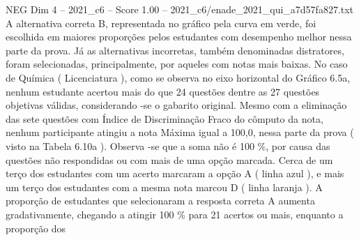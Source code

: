 \begin{textsample}{NEG Dim 4 – 2021\_c6 – Score 1.00 – 2021\_c6/enade\_2021\_qui\_a7d57fa827.txt}
A alternativa correta B, representada no gráfico pela curva em verde, foi escolhida em maiores proporções pelos estudantes com desempenho melhor nessa parte da prova.
Já as alternativas incorretas, também denominadas distratores, foram selecionadas, principalmente, por aqueles com notas mais baixas.
No caso de Química ( Licenciatura ), como se observa no eixo horizontal do Gráfico 6.5a, nenhum estudante acertou mais do que 24 questões dentre as 27 questões objetivas válidas, considerando -se o gabarito original.
Mesmo com a eliminação das sete questões com Índice de Discriminação Fraco do cômputo da nota, nenhum participante atingiu a nota Máxima igual a 100,0, nessa parte da prova ( visto na Tabela 6.10a ).
Observa -se que a soma não é 100 \%, por causa das questões não respondidas ou com mais de uma opção marcada.
Cerca de um terço dos estudantes com um acerto marcaram a opção A ( linha azul ), e mais um terço dos estudantes com a mesma nota marcou D ( linha laranja ).
A proporção de estudantes que selecionaram a resposta correta A aumenta gradativamente, chegando a atingir 100 \% para 21 acertos ou mais, enquanto a proporção dos

\end{textsample}
